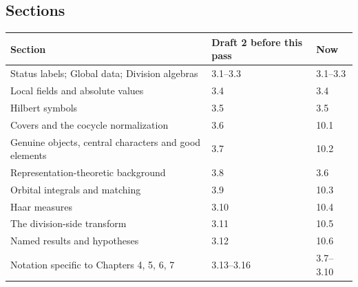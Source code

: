 \documentclass[12pt,letterpaper]{article}
\begin{document}
\subsection{Sections}
\begin{center}
\begin{tabular}{@{}lll@{}}\toprule
Section & Draft 2 before this pass & Now\\\midrule
Status labels; Global data; Division algebras & 3.1--3.3 & 3.1--3.3\\
Local fields and absolute values & 3.4 & 3.4\\
Hilbert symbols & 3.5 & 3.5\\
Covers and the cocycle normalization & 3.6 & 10.1\\
Genuine objects, central characters and good elements & 3.7 & 10.2\\
Representation-theoretic background & 3.8 & 3.6\\
Orbital integrals and matching & 3.9 & 10.3\\
Haar measures & 3.10 & 10.4\\
The division-side transform & 3.11 & 10.5\\
Named results and hypotheses & 3.12 & 10.6\\
Notation specific to Chapters 4, 5, 6, 7 & 3.13--3.16 & 3.7--3.10\\
\bottomrule\end{tabular}
\end{center}
\end{document}
